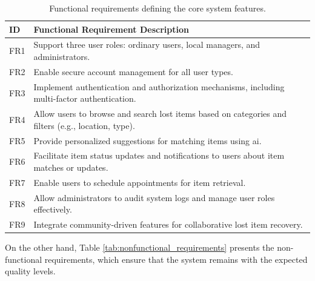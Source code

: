 \begin{table}[!htb]
\centering
\begin{tabular}{|p{}|p{}|}
\hline
\textbf{ID} & \textbf{Functional Requirement Description} \\ \hline
FR1 & Support three user roles: ordinary users, local managers, and administrators. \\ \hline
FR2 & Enable secure account management for all user types. \\ \hline
FR3 & Implement authentication and authorization mechanisms, including multi-factor authentication. \\ \hline
FR4 & Allow users to browse and search lost items based on categories and filters (e.g., location, type). \\ \hline
FR5 & Provide personalized suggestions for matching items using \ac{ai}. \\ \hline
FR6 & Facilitate item status updates and notifications to users about item matches or updates. \\ \hline
FR7 & Enable users to schedule appointments for item retrieval. \\ \hline
FR8 & Allow administrators to audit system logs and manage user roles effectively. \\ \hline
FR9 & Integrate community-driven features for collaborative lost item recovery. \\ \hline
\end{tabular}
\caption[Functional Requirements]{Functional requirements defining the core system features.}
\label{tab:functional_requirements}
\end{table}

On the other hand, Table \ref{tab:nonfunctional_requirements} presents the non-functional requirements, which ensure that the system remains with the expected quality levels.

